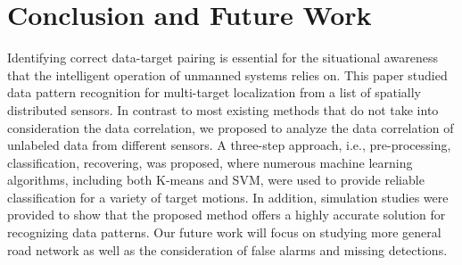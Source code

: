 \documentclass[letterpaper, 10 pt, conference]{ieeeconf}
\begin{document}
\section{Conclusion and Future Work}\label{sec:con}
Identifying correct data-target pairing is essential for the situational awareness that the intelligent operation of unmanned systems relies on. This paper studied data pattern recognition for multi-target localization from a list of spatially distributed sensors. In contrast to most existing methods that do not take into consideration the data correlation, we proposed to analyze the data correlation of unlabeled data from different sensors. A three-step approach, i.e., pre-processing, classification, recovering, was proposed, where numerous machine learning algorithms, including both K-means and SVM, were used to provide reliable classification for a variety of target motions.  In addition, simulation studies were provided to show that the proposed method offers a highly accurate solution for recognizing data patterns. Our future work will focus on studying more general road network as well as the consideration of false alarms and missing detections.



\end{document}

